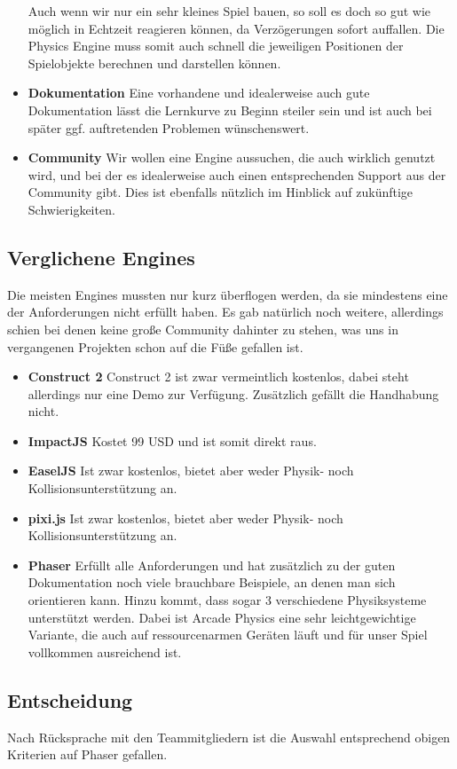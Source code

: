 \begin{itemize}
Auch wenn wir nur ein sehr kleines Spiel bauen, so soll es doch so gut wie möglich in Echtzeit reagieren können, da Verzögerungen sofort auffallen. Die Physics Engine muss somit auch schnell die jeweiligen Positionen der Spielobjekte berechnen und darstellen können.
\item \textbf{Dokumentation} \newline
Eine vorhandene und idealerweise auch gute Dokumentation lässt die Lernkurve zu Beginn steiler sein und ist auch bei später ggf. auftretenden Problemen wünschenswert.
\item \textbf{Community} \newline
Wir wollen eine Engine aussuchen, die auch wirklich genutzt wird, und bei der es idealerweise auch einen entsprechenden Support aus der Community gibt. Dies ist ebenfalls nützlich im Hinblick auf zukünftige Schwierigkeiten.
\end{itemize}

\subsection{Verglichene Engines}
Die meisten Engines mussten nur kurz überflogen werden, da sie mindestens eine der Anforderungen nicht erfüllt haben. Es gab natürlich noch weitere, allerdings schien bei denen keine große Community dahinter zu stehen, was uns in vergangenen Projekten schon auf die Füße gefallen ist.
\begin{itemize}
\item \textbf{Construct 2} \newline
Construct 2 ist zwar vermeintlich kostenlos, dabei steht allerdings nur eine Demo zur Verfügung. Zusätzlich gefällt die Handhabung nicht.
\item \textbf{ImpactJS} \newline
Kostet 99 USD und ist somit direkt raus.
\item \textbf{EaselJS} \newline
Ist zwar kostenlos, bietet aber weder Physik- noch Kollisionsunterstützung an.
\item \textbf{pixi.js} \newline
Ist zwar kostenlos, bietet aber weder Physik- noch Kollisionsunterstützung an.
\item \textbf{Phaser} \newline
Erfüllt alle Anforderungen und hat zusätzlich zu der guten Dokumentation noch viele brauchbare Beispiele, an denen man sich orientieren kann. Hinzu kommt, dass sogar 3 verschiedene Physiksysteme unterstützt werden. Dabei ist Arcade Physics eine sehr leichtgewichtige Variante, die auch auf ressourcenarmen Geräten läuft und für unser Spiel vollkommen ausreichend ist.
\end{itemize}

\subsection{Entscheidung}
Nach Rücksprache mit den Teammitgliedern ist die Auswahl entsprechend obigen Kriterien auf Phaser gefallen.
